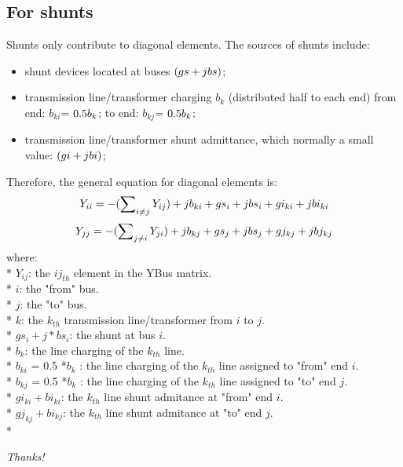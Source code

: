\documentclass[12pt]{article}
\begin{document}
\subsection*{For shunts}
Shunts only contribute to diagonal elements. The sources of shunts include:
\begin{itemize}
\item shunt devices located at buses $(gs+j\*bs)$;
\item transmission line/transformer charging $b_{k}$ (distributed half to each end)
     from end: $b_{ki}$= $0.5\*b_{k}$;
     to end: $b_{kj}$= $0.5\*b_{k}$;
\item transmission line/transformer shunt admittance, which normally a small value: $(gi+j\*bi)$; 
\end{itemize}
Therefore, the general equation for diagonal elements is:
\begin{equation}
Y_{ii} = - (\sum\nolimits_{i\ne j} Y_{ij}) + j\*b_{ki} + gs_{i}+j\*bs_{i} + gi_{ki}+j\*bi_{ki}
\end{equation} 
\begin{equation}
Y_{jj} = - (\sum\nolimits_{j\ne i} Y_{ji}) + j\*b_{kj} + gs_{j}+j\*bs_{j} + gj_{kj}+j\*bj_{kj}
\end{equation} 
where:\\*
$Y_{ij}$: the ${ij}_{th}$ element in the YBus matrix.\\* 
$i$: the "from" bus. \\*
$j$: the "to" bus. \\*
$k$: the $k_{th}$ transmission line/transformer from $i$ to $j$. \\*
$gs_{i}+j*bs_{i}$: the shunt at bus $i$. \\*
$b_{k}$: the line charging of the $k_{th}$ line. \\*
$b_{ki}$ = 0.5 *$b_{k}$ : the line charging of the $k_{th}$ line assigned to "from" end $i$. \\*
$b_{kj}$ = 0.5 *$b_{k}$ : the line charging of the $k_{th}$ line assigned to "to" end $j$. \\*
$gi_{ki}+bi_{ki}$: the $k_{th}$ line shunt admitance at "from" end $i$. \\*
$gj_{kj}+bi_{kj}$: the $k_{th}$ line shunt admitance at "to" end $j$. \\*


\begin{center}
\textit{Thanks!}
\end{center}
\end{document}
